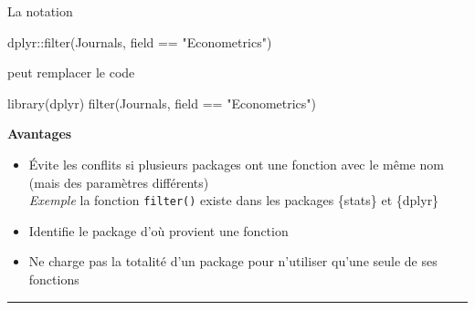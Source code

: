 \documentclass[
  french,
  10pt,
  a4paper,
]{article}
\newenvironment{Shaded}{}{}
\newcommand{\FunctionTok}[1]{\textcolor[rgb]{0.25,0.47,0.95}{#1}}
\newcommand{\NormalTok}[1]{\textcolor[rgb]{0.22,0.23,0.26}{#1}}
\newcommand{\SpecialCharTok}[1]{\textcolor[rgb]{0.00,0.52,0.74}{#1}}
\newcommand{\StringTok}[1]{\textcolor[rgb]{0.31,0.63,0.31}{#1}}
\providecommand{\tightlist}{%
  \setlength{\itemsep}{0pt}\setlength{\parskip}{0pt}}
\begin{document}
\begin{tcolorbox}[enhanced jigsaw, arc=.35mm, bottomrule=.15mm, bottomtitle=1mm, breakable, colback=white, colbacktitle=quarto-callout-note-color!10!white, colframe=quarto-callout-note-color-frame, coltitle=black, left=2mm, leftrule=.75mm, opacityback=0, opacitybacktitle=0.6, rightrule=.15mm, title=\textcolor{quarto-callout-note-color}{\faInfo}\hspace{0.5em}{Le préfixage}, titlerule=0mm, toprule=.15mm, toptitle=1mm]

La notation

\begin{Shaded}
\begin{Highlighting}[]
\NormalTok{dplyr}\SpecialCharTok{::}\FunctionTok{filter}\NormalTok{(Journals, field }\SpecialCharTok{==} \StringTok{"Econometrics"}\NormalTok{)}
\end{Highlighting}
\end{Shaded}

peut remplacer le code

\begin{Shaded}
\begin{Highlighting}[]
\FunctionTok{library}\NormalTok{(dplyr)}
\FunctionTok{filter}\NormalTok{(Journals, field }\SpecialCharTok{==} \StringTok{"Econometrics"}\NormalTok{)}
\end{Highlighting}
\end{Shaded}

\textbf{Avantages}

\begin{itemize}
\tightlist
\item
  Évite les conflits si plusieurs packages ont une fonction avec le même
  nom (mais des paramètres différents)\\
  \emph{Exemple} la fonction \texttt{filter()} existe dans les packages
  \{stats\} et \{dplyr\}
\item
  Identifie le package d'où provient une fonction
\item
  Ne charge pas la totalité d'un package pour n'utiliser qu'une seule de
  ses fonctions
\end{itemize}

\end{tcolorbox}

\begin{center}\rule{0.5\linewidth}{0.5pt}\end{center}
\end{document}
